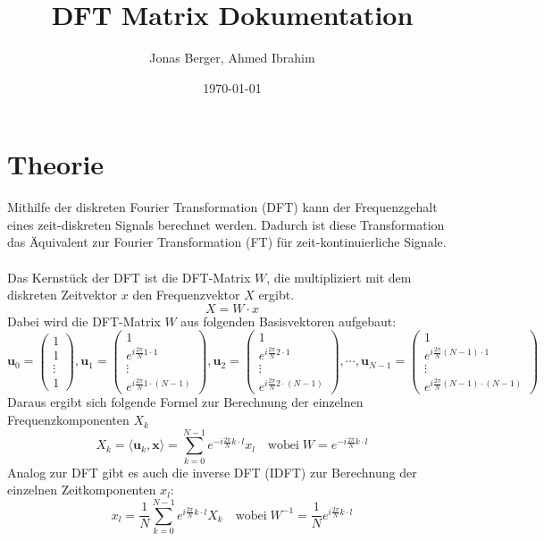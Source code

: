 \documentclass[12pt,a4paper]{article}
\title{DFT Matrix Dokumentation}
\author{Jonas Berger, Ahmed Ibrahim}
\date{\today}
\let\vec\mathbf %
\begin{document}
	\maketitle
	\thispagestyle{empty}
	\pagebreak
	\tableofcontents
	\pagebreak
	
	\section{Theorie}
	Mithilfe der diskreten Fourier Transformation (DFT) kann der Frequenzgehalt eines zeit-diskreten Signals berechnet werden.
	Dadurch ist diese Transformation das Äquivalent zur Fourier Transformation (FT) für zeit-kontinuierliche Signale.\\\\
	Das Kernstück der DFT ist die DFT-Matrix $W$, die multipliziert mit dem diskreten Zeitvektor $x$ den Frequenzvektor $X$ ergibt.
	\begin{equation*}
		X = W \cdot x
	\end{equation*}	
	Dabei wird die DFT-Matrix $W$ aus folgenden Basisvektoren aufgebaut:
	\begin{equation*}
		\vec{u}_0=\begin{pmatrix} 1 \\ 1 \\ \vdots \\ 1 \end{pmatrix},
		\vec{u}_1=\begin{pmatrix} 1 \\ e^{i\frac{2\pi}{N}1\cdot 1} \\ \vdots \\ e^{i\frac{2\pi}{N}1\cdot (N-1)} \end{pmatrix},
		\vec{u}_2=\begin{pmatrix} 1 \\ e^{i\frac{2\pi}{N}2\cdot 1} \\ \vdots \\ e^{i\frac{2\pi}{N}2\cdot (N-1)} \end{pmatrix}, \cdots, 
		\vec{u}_{N-1}=\begin{pmatrix} 1 \\ e^{i\frac{2\pi}{N}(N-1)\cdot 1} \\ \vdots \\ e^{i\frac{2\pi}{N}(N-1)\cdot (N-1)} \end{pmatrix}
	\end{equation*}
	Daraus ergibt sich folgende Formel zur Berechnung der einzelnen Frequenzkomponenten $X_k$
	\begin{equation*}
		X_k = \langle \vec{u}_k,\vec{x} \rangle = \sum_{k=0}^{N-1} e^{-i\frac{2\pi}{N}k\cdot l} x_l
		\quad
		\text{wobei} \; W = e^{-i\frac{2\pi}{N}k\cdot l}
	\end{equation*}
	Analog zur DFT gibt es auch die inverse DFT (IDFT) zur Berechnung der einzelnen Zeitkomponenten $x_l$:
	\begin{equation*}
		x_l = \frac{1}{N}\sum_{k=0}^{N-1} e^{i\frac{2\pi}{N}k\cdot l} X_k \quad
		\text{wobei} \; W^{-1} = \frac{1}{N}e^{i\frac{2\pi}{N}k\cdot l}
	\end{equation*}
	
\end{document}
